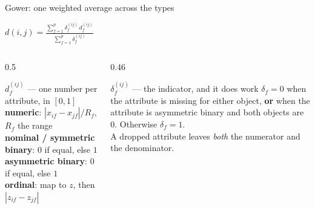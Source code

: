 \documentclass[aspectratio=169]{beamer}
\begin{document}
\begin{frame}[shrink=4]{Gower: one weighted average across the types}
  \begin{exampleblock}{}
    \centering\large
    $\displaystyle d(i,j) =
      \frac{\sum_{f=1}^{p} \delta_f^{(ij)} \, d_f^{(ij)}}
           {\sum_{f=1}^{p} \delta_f^{(ij)}}$
  \end{exampleblock}
  \begin{columns}[T]
    \begin{column}{0.5\textwidth}
      \begin{block}{$d_f^{(ij)}$ --- one number per attribute, in $[0,1]$}
        \small
        \textbf{numeric}: $|x_{if}-x_{jf}| / R_f$, $R_f$ the range\\
        \textbf{nominal / symmetric binary}: $0$ if equal, else $1$\\
        \textbf{asymmetric binary}: $0$ if equal, else $1$\\
        \textbf{ordinal}: map to $z$, then $|z_{if} - z_{jf}|$
      \end{block}
    \end{column}
    \begin{column}{0.46\textwidth}
      \begin{alertblock}{$\delta_f^{(ij)}$ --- the indicator, and it does work}
        $\delta_f = 0$ when the attribute is missing for either object,
        \textbf{or} when the attribute is asymmetric binary and both objects
        are $0$. Otherwise $\delta_f = 1$.\\[0.3em]
        A dropped attribute leaves \emph{both} the numerator and the
        denominator.
      \end{alertblock}
    \end{column}
  \end{columns}
\end{frame}
\end{document}
